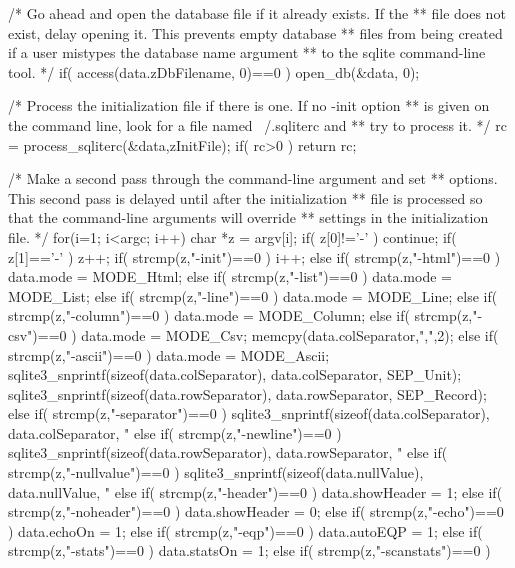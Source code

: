 \begin{Codex}[label=shell.c,numbers=left]
{  /* Go ahead and open the database file if it already exists.  If the
  ** file does not exist, delay opening it.  This prevents empty database
  ** files from being created if a user mistypes the database name argument
  ** to the sqlite command-line tool.
  */
  if( access(data.zDbFilename, 0)==0 ){
    open_db(&data, 0);
  }

  /* Process the initialization file if there is one.  If no -init option
  ** is given on the command line, look for a file named ~/.sqliterc and
  ** try to process it.
  */
  rc = process_sqliterc(&data,zInitFile);
  if( rc>0 ){
    return rc;
  }

  /* Make a second pass through the command-line argument and set
  ** options.  This second pass is delayed until after the initialization
  ** file is processed so that the command-line arguments will override
  ** settings in the initialization file.
  */
  for(i=1; i<argc; i++){
    char *z = argv[i];
    if( z[0]!='-' ) continue;
    if( z[1]=='-' ){ z++; }
    if( strcmp(z,"-init")==0 ){
      i++;
    }else if( strcmp(z,"-html")==0 ){
      data.mode = MODE_Html;
    }else if( strcmp(z,"-list")==0 ){
      data.mode = MODE_List;
    }else if( strcmp(z,"-line")==0 ){
      data.mode = MODE_Line;
    }else if( strcmp(z,"-column")==0 ){
      data.mode = MODE_Column;
    }else if( strcmp(z,"-csv")==0 ){
      data.mode = MODE_Csv;
      memcpy(data.colSeparator,",",2);
    }else if( strcmp(z,"-ascii")==0 ){
      data.mode = MODE_Ascii;
      sqlite3_snprintf(sizeof(data.colSeparator), data.colSeparator,
                       SEP_Unit);
      sqlite3_snprintf(sizeof(data.rowSeparator), data.rowSeparator,
                       SEP_Record);
    }else if( strcmp(z,"-separator")==0 ){
      sqlite3_snprintf(sizeof(data.colSeparator), data.colSeparator,
                       "%
    }else if( strcmp(z,"-newline")==0 ){
      sqlite3_snprintf(sizeof(data.rowSeparator), data.rowSeparator,
                       "%
    }else if( strcmp(z,"-nullvalue")==0 ){
      sqlite3_snprintf(sizeof(data.nullValue), data.nullValue,
                       "%
    }else if( strcmp(z,"-header")==0 ){
      data.showHeader = 1;
    }else if( strcmp(z,"-noheader")==0 ){
      data.showHeader = 0;
    }else if( strcmp(z,"-echo")==0 ){
      data.echoOn = 1;
    }else if( strcmp(z,"-eqp")==0 ){
      data.autoEQP = 1;
    }else if( strcmp(z,"-stats")==0 ){
      data.statsOn = 1;
    }else if( strcmp(z,"-scanstats")==0 ){
}}}
\end{Codex}
